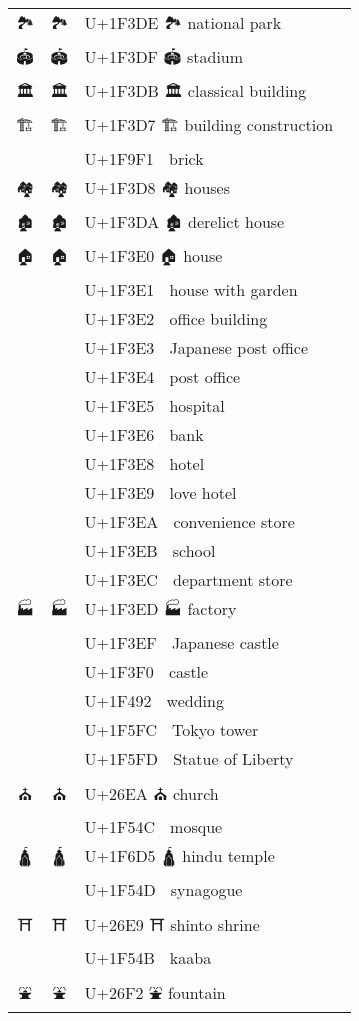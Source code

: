 \documentclass[a4paper,12pt]{ltjarticle}
\newcommand{\fontA}[1]{{\fontspec[RawFeature={mode=harf,+dist,+ccmp}]{Segoe UI Emoji} #1}}
\newcommand{\fontB}[1]{{\fontspec[RawFeature={mode=harf,+dist,+ccmp}]{Noto Color Emoji} #1}}
\begin{document}
\begin{longtable}[c]{ccp{0.8\linewidth}}
\fontA{🏞}&\fontB{🏞}&U+1F3DE 🏞 national park\\
\fontA{🏟}&\fontB{🏟}&U+1F3DF 🏟 stadium\\
\fontA{🏛}&\fontB{🏛}&U+1F3DB 🏛 classical building\\
\fontA{🏗}&\fontB{🏗}&U+1F3D7 🏗 building construction\\
\fontA{🧱}&\fontB{🧱}&U+1F9F1 🧱 brick\\
\fontA{🏘}&\fontB{🏘}&U+1F3D8 🏘 houses\\
\fontA{🏚}&\fontB{🏚}&U+1F3DA 🏚 derelict house\\
\fontA{🏠}&\fontB{🏠}&U+1F3E0 🏠 house\\
\fontA{🏡}&\fontB{🏡}&U+1F3E1 🏡 house with garden\\
\fontA{🏢}&\fontB{🏢}&U+1F3E2 🏢 office building\\
\fontA{🏣}&\fontB{🏣}&U+1F3E3 🏣 Japanese post office\\
\fontA{🏤}&\fontB{🏤}&U+1F3E4 🏤 post office\\
\fontA{🏥}&\fontB{🏥}&U+1F3E5 🏥 hospital\\
\fontA{🏦}&\fontB{🏦}&U+1F3E6 🏦 bank\\
\fontA{🏨}&\fontB{🏨}&U+1F3E8 🏨 hotel\\
\fontA{🏩}&\fontB{🏩}&U+1F3E9 🏩 love hotel\\
\fontA{🏪}&\fontB{🏪}&U+1F3EA 🏪 convenience store\\
\fontA{🏫}&\fontB{🏫}&U+1F3EB 🏫 school\\
\fontA{🏬}&\fontB{🏬}&U+1F3EC 🏬 department store\\
\fontA{🏭}&\fontB{🏭}&U+1F3ED 🏭 factory\\
\fontA{🏯}&\fontB{🏯}&U+1F3EF 🏯 Japanese castle\\
\fontA{🏰}&\fontB{🏰}&U+1F3F0 🏰 castle\\
\fontA{💒}&\fontB{💒}&U+1F492 💒 wedding\\
\fontA{🗼}&\fontB{🗼}&U+1F5FC 🗼 Tokyo tower\\
\fontA{🗽}&\fontB{🗽}&U+1F5FD 🗽 Statue of Liberty\\
\fontA{⛪}&\fontB{⛪}&U+26EA ⛪ church\\
\fontA{🕌}&\fontB{🕌}&U+1F54C 🕌 mosque\\
\fontA{🛕}&\fontB{🛕}&U+1F6D5 🛕 hindu temple\\
\fontA{🕍}&\fontB{🕍}&U+1F54D 🕍 synagogue\\
\fontA{⛩}&\fontB{⛩}&U+26E9 ⛩ shinto shrine\\
\fontA{🕋}&\fontB{🕋}&U+1F54B 🕋 kaaba\\
\fontA{⛲}&\fontB{⛲}&U+26F2 ⛲ fountain\\

\end{longtable}
\end{document}
